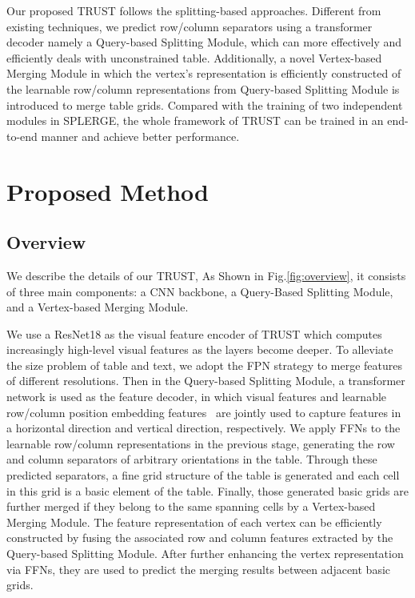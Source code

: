 \documentclass[lettersize,journal]{IEEEtran}
\begin{document}
Our proposed TRUST follows the splitting-based approaches. Different from existing techniques, we predict row/column separators using a transformer decoder namely a Query-based Splitting Module, which can more effectively and efficiently deals with unconstrained table. Additionally, a novel Vertex-based Merging Module in which the vertex's representation is efficiently constructed of the learnable row/column representations from Query-based Splitting Module is introduced to merge table grids. Compared with the training of two independent modules in SPLERGE\cite{tensmeyer2019deep}, the whole framework of TRUST can be trained in an end-to-end manner and achieve better performance.


\section{Proposed Method}
\subsection{Overview}
We describe the details of our TRUST, As Shown in Fig.\ref{fig:overview}, it consists of three main components: a CNN backbone, a Query-Based Splitting Module, and a Vertex-based Merging Module. 

We use a ResNet18\cite{he2016deep} as the visual feature encoder of TRUST which computes increasingly high-level visual features as the layers become deeper. To alleviate the size problem of table and text, we adopt the FPN\cite{lin2017feature} strategy to merge features of different resolutions. Then in the Query-based Splitting Module, a transformer network is used as the feature decoder, in which visual features and learnable row/column position embedding features~\cite{carion2020end} are jointly used to capture features in a horizontal direction and vertical direction, respectively. We apply FFNs to the learnable row/column representations in the previous stage, generating the row and column separators of arbitrary orientations in the table. Through these predicted separators, a fine grid structure of the table is generated and each cell in this grid is a basic element of the table. Finally, those generated basic grids are further merged if they belong to the same spanning cells by a Vertex-based Merging Module. The feature representation of each vertex can be efficiently constructed by fusing the associated row and column features extracted by the Query-based Splitting Module. After further enhancing the vertex representation via FFNs, they are used to predict the merging results between adjacent basic grids.
\end{document}
